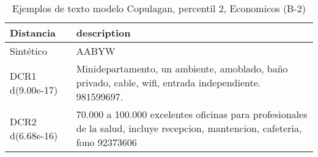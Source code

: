\begin{table}[H]
\centering
\fontsize{10}{14}\selectfont
\caption{Ejemplos de texto modelo Copulagan, percentil 2, Economicos (B-2)}
\label{table-example-economicos-b-2-copulagan-2p-text}
\begin{tabular}{|l|m{35em}|}
\hline
\rowcolor[gray]{0.8}
Distancia & description \\
\hline Sintético & AABYW \\
\hline DCR1 d(9.00e-17) & Minidepartamento, un ambiente, amoblado, ba\~no privado, cable, wifi, entrada independiente. 981599697. \\
\hline DCR2 d(6.68e-16) & 70.000 a 100.000 excelentes oficinas para profesionales de la salud, incluye recepcion, mantencion, cafeteria, fono 92373606 \\
\hline
\end{tabular}
\end{table}
